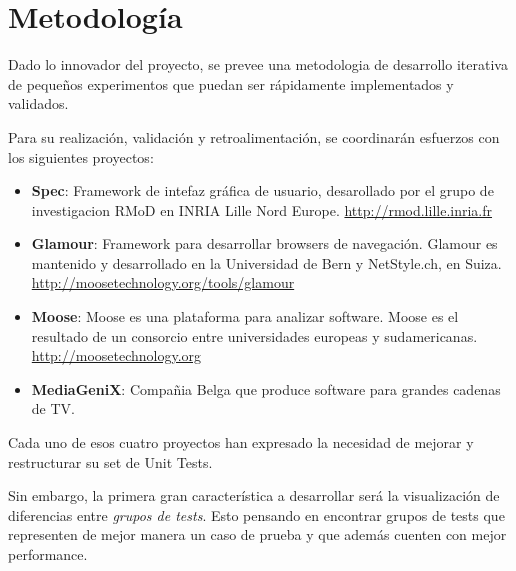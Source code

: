 \documentclass[12pt,spanish,letterpaper]{article}
\begin{document}

\section{Metodología}
\par Dado lo innovador del proyecto, se prevee una metodologia de desarrollo iterativa de pequeños experimentos que puedan ser rápidamente implementados y validados.
\par Para su realización, validación y retroalimentación, se coordinarán esfuerzos con los siguientes proyectos:
\begin{itemize}
\item \textbf{Spec}:  Framework de intefaz gráfica de usuario, desarollado por el grupo de investigacion RMoD en INRIA Lille Nord Europe. \url{http://rmod.lille.inria.fr}
\item \textbf{Glamour}: Framework para desarrollar browsers de navegación. Glamour es mantenido y desarrollado en la Universidad de Bern y NetStyle.ch, en Suiza. \url{http://moosetechnology.org/tools/glamour}
\item \textbf{Moose}: Moose es una plataforma para analizar software. Moose es el resultado de un consorcio entre universidades europeas y sudamericanas. \url{http://moosetechnology.org}
\item \textbf{MediaGeniX}: Compañia Belga que produce software para grandes cadenas de TV.
\end{itemize}

\par Cada uno de esos cuatro proyectos han expresado la necesidad de mejorar y restructurar su set de Unit Tests.

\par Sin embargo, la primera gran característica a desarrollar será la visualización de diferencias entre \emph{grupos de tests}. Esto pensando en encontrar grupos de tests que representen de mejor manera un caso de prueba y que además cuenten con mejor performance.


\end{document}
